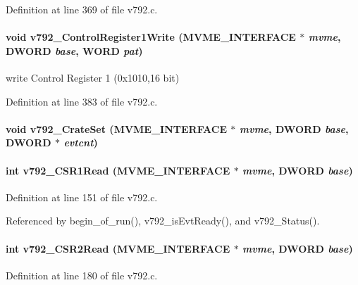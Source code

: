 Definition at line 369 of file v792.c.
\paragraph[{v792\_\-ControlRegister1Write}]{\setlength{\rightskip}{0pt plus 5cm}void v792\_\-ControlRegister1Write ({\bf MVME\_\-INTERFACE} $\ast$ {\em mvme}, \/  {\bf DWORD} {\em base}, \/  {\bf WORD} {\em pat})}\hfill\label{v792_8h_ac3b568047c03f5b511378cd608eb11fd}
write Control Register 1 (0x1010,16 bit) 

Definition at line 383 of file v792.c.
\paragraph[{v792\_\-CrateSet}]{\setlength{\rightskip}{0pt plus 5cm}void v792\_\-CrateSet ({\bf MVME\_\-INTERFACE} $\ast$ {\em mvme}, \/  {\bf DWORD} {\em base}, \/  {\bf DWORD} $\ast$ {\em evtcnt})}\hfill\label{v792_8h_a2c9926a34e5afa81cdc7d27e7f754ee5}
\paragraph[{v792\_\-CSR1Read}]{\setlength{\rightskip}{0pt plus 5cm}int v792\_\-CSR1Read ({\bf MVME\_\-INTERFACE} $\ast$ {\em mvme}, \/  {\bf DWORD} {\em base})}\hfill\label{v792_8h_a01124a009c024fb70d7243658facd6b9}


Definition at line 151 of file v792.c.

Referenced by begin\_\-of\_\-run(), v792\_\-isEvtReady(), and v792\_\-Status().
\paragraph[{v792\_\-CSR2Read}]{\setlength{\rightskip}{0pt plus 5cm}int v792\_\-CSR2Read ({\bf MVME\_\-INTERFACE} $\ast$ {\em mvme}, \/  {\bf DWORD} {\em base})}\hfill\label{v792_8h_a9ae4f1b71440bde11d896df999b80e7e}


Definition at line 180 of file v792.c.

